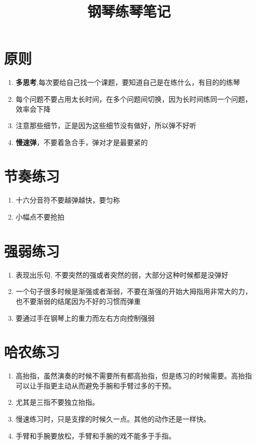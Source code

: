 \documentclass[UTF8]{ctexart}
\title{钢琴练琴笔记}
\begin{document}
\maketitle

\section{原则}

\begin{enumerate}
    \item \textbf{多思考},每次要给自己找一个课题，要知道自己是在练什么，有目的的练琴
    \item 每个问题不要占用太长时间，在多个问题间切换，因为长时间练同一个问题，效率会下降
    \item 注意那些细节，正是因为这些细节没有做好，所以弹不好听
    \item \textbf{慢速弹}，不要着急合手，弹对才是最要紧的
\end{enumerate}

\section{节奏练习}

\begin{enumerate}
    \item 十六分音符不要越弹越快，要匀称 
    \item 小幅点不要抢拍 
\end{enumerate}


\section{强弱练习}

\begin{enumerate} 
    \item 表现出乐句, 不要突然的强或者突然的弱，大部分这种时候都是没弹好
    \item 一个句子很多时候是渐强或者渐弱，不要在渐强的开始大拇指用非常大的力，也不要渐弱的结尾因为不好的习惯而弹重
    \item 要通过手在钢琴上的重力而左右方向控制强弱 
\end{enumerate}



\section{哈农练习}

\begin{enumerate}
    \item 高抬指，虽然演奏的时候不需要所有都高抬指，但是练习的时候需要。高抬指可以让手指更主动从而避免手腕和手臂过多的干预。
    \item 尤其是三指不要独立抬指。
    \item 慢速练习时，只是支撑的时候久一点。其他的动作还是一样快。
    \item 手臂和手腕要放松，手臂和手腕的戏不能多于手指。
\end{enumerate}
\end{document}
